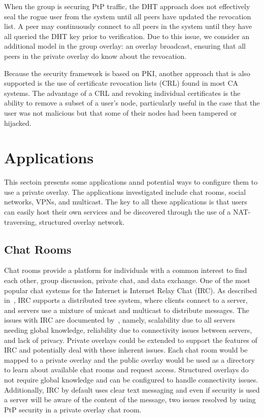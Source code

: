 When the group is securing PtP traffic, the DHT approach does not effectively
seal the rogue user from the system until all peers have updated the revocation
list.  A peer may continuously connect to all peers in the system until they
have all queried the DHT key prior to verification.  Due to this issue, we 
consider an additional model in the group overlay: an overlay broadcast, ensuring
that all peers in the private overlay do know about the revocation.  

Because the security framework is based on PKI, another approach that is also
supported is the use of certificate revocation lists (CRL) found in most CA
systems.  The advantage of a CRL and revoking individual certificates is the
ability to remove a subset of a user's node, particularly useful in the case
that the user was not malicious but that some of their nodes had been tampered
or hijacked.

\section{Applications}
\label{applications}
This sectoin presents some applications annd potential ways to configure them
to use a private overlay.  The applications investigated include chat rooms,
social networks, VPNs, and multicast.  The key to all these applications is that
users can easily host their own services and be discovered through the use of
a NAT-traversing, structured overlay network.

\subsection{Chat Rooms}
Chat rooms provide a platform for individuals with a common interest to find
each other, group discussion, private chat, and data exchange.  One of the most
popular chat systems for the Internet is Internet Relay Chat (IRC).  As
described in~\cite{irc}, IRC supports a distributed tree system, where clients
connect to a server, and servers use a mixture of unicast and multicast to
distribute messages.  The issues with IRC are documented by~\cite{irc_arch},
namely, scalability due to all servers needing global knowledge, reliability due
to connectivity issues between servers, and lack of privacy.  Private overlays
could be extended to support the features of IRC and potentially deal with these
inherent issues.  Each chat room would be mapped to a private overlay and the
public overlay would be used as a directory to learn about available chat rooms
and request access.  Structured overlays do not require global knowledge and can
be configured to handle connectivity issues.  Additionally, IRC by default uses
clear text messaging and even if security is used a server will be aware of the
content of the message, two issues resolved by using PtP security in a private
overlay chat room.  

